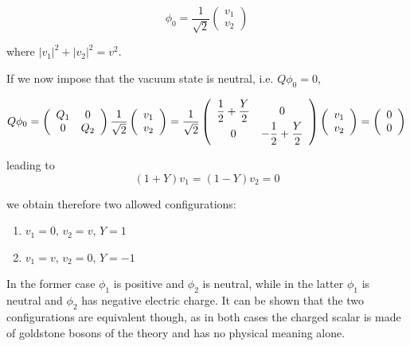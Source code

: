\begin{equation}
\phi_0 = \dfrac{1}{\sqrt{2}} \left(\begin{array}{c}v_1 \\v_2\end{array}\right)
\end{equation}

where $|v_1|^2 + |v_2|^2 = v^2$.

If we now impose that the vacuum state is neutral, i.e. $Q\phi_0 = 0$, 

\begin{equation}
Q\phi_0 = \left(\begin{array}{cc}Q_1 & 0 \\0 & Q_2\end{array}\right)   \dfrac{1}{\sqrt{2}} \left(\begin{array}{c}v_1 \\v_2\end{array}\right) = \dfrac{1}{\sqrt{2}} \left(\begin{array}{cc}\dfrac{1}{2} + \dfrac{Y}{2} & 0 \\0 & -\dfrac{1}{2} + \dfrac{Y}{2}\end{array}\right) \left(\begin{array}{c}v_1 \\v_2\end{array}\right) = \left(\begin{array}{c}0 \\0\end{array}\right)
\end{equation}

leading to
\begin{equation}
(1+Y)v_1 = (1-Y)v_2 = 0
\end{equation}

we obtain therefore two allowed configurations:

\begin{enumerate}
\item $v_1 = 0, \, v_2 = v, \, Y = 1$
\item $v_1 = v, \, v_2 = 0, \, Y = -1$
\end{enumerate}

In the former case $\phi_1$ is positive and $\phi_2$ is neutral, while in the latter $\phi_1$ is neutral and $\phi_2$ has negative electric charge. It can be shown that the two configurations are equivalent though, as in both cases the charged scalar is made of goldstone bosons of the theory and has no physical meaning alone.


